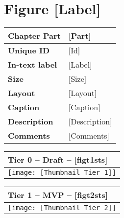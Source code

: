 \section{Figure [Label]} \label{sec_[Label]}

\small

\begin{table}[h!] %
\centering
\small %
\sffamily %
\begin{tabular}{| m{4cm} | m{10cm} |}
    \hline
    \textbf{Chapter Part} & [Part] \\
    \hline
    \textbf{Unique ID} & [Id] \\
    \hline
    \textbf{In-text label} & [Label] \\
    \hline
    \textbf{Size} & [Size] \\
    \hline
    \textbf{Layout} & [Layout] \\
    \hline
    \textbf{Caption} & \scriptsize{[Caption]} \\
    \hline
    \textbf{Description} & \scriptsize{[Description]} \\
    \hline
    \textbf{Comments} & \scriptsize{[Comments]} \\
    \hline
    \end{tabular}
\end{table}

\begin{table}[h!] %
\centering
\small %
\sffamily %
\begin{tabular}{| m{14.5cm} |}
    \hline
    \textbf{Tier 0 -- Draft -- [figt1sts]}   \\
    \hline
    \texttt{[image: [Thumbnail Tier 1]]} \\
    \hline
    \end{tabular}
\end{table}

\begin{table}[h!] %
\centering
\small %
\sffamily %
\begin{tabular}{| m{14.5cm} |}
    \hline
    \textbf{Tier 1 -- MVP -- [figt2sts]} \\
    \hline
    \texttt{[image: [Thumbnail Tier 2]]} \\
    \hline
    \end{tabular}
\end{table}